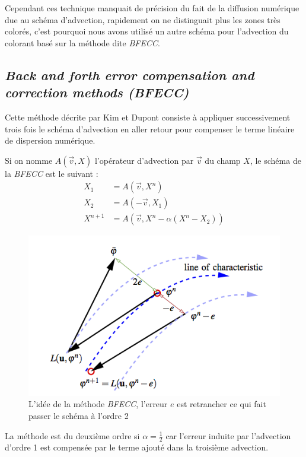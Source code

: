 		Cependant ces technique manquait de précision du fait de la diffusion numérique due au schéma d'advection, rapidement on ne distinguait plus les zones très colorés, c'est pourquoi nous avons utilisé un autre schéma pour l'advection du colorant basé sur la méthode dite \emph{BFECC}.
		
	\subsection{\emph{Back and forth error compensation and correction methods (BFECC)}}
		Cette méthode décrite par Kim \cite{Advect} et Dupont \cite{BFECC} consiste à appliquer successivement trois fois le schéma d'advection en aller retour pour compenser le terme linéaire de dispersion numérique.
		
		Si on nomme $A(\overrightarrow{v},X)$ l'opérateur d'advection par $\overrightarrow{v}$ du champ $X$, le schéma de la \emph{BFECC} est le suivant :
		\begin{align*}
  			X_1 &	= A(\overrightarrow{v},X^n) \\
			X_2	&	= A(-\overrightarrow{v},X_1)\\
			X^{n+1}&	= A(\overrightarrow{v},X^n-\alpha(X^n-X_2))
		\end{align*}	
		
		\begin{figure}[htbp]
		\begin{center}
			\includegraphics[width=0.7 \textwidth]{explain_BFECC.png}
			\caption{L'idée de la méthode \emph{BFECC}, l'erreur $e$ est retrancher ce qui fait passer le schéma à l'ordre 2 \cite{Advect}}
		\end{center}
		\end{figure}				
		
		La méthode est du deuxième ordre si $\alpha = \frac{1}{2} $ car l'erreur induite par l'advection d'ordre 1 est compensée par le terme ajouté dans la troisième advection.
		
